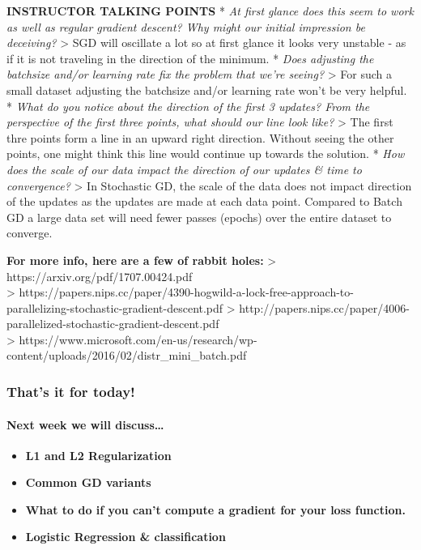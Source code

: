\documentclass[11pt]{article}
\providecommand{\tightlist}{%
      \setlength{\itemsep}{0pt}\setlength{\parskip}{0pt}}
\begin{document}
\textbf{INSTRUCTOR TALKING POINTS} * \emph{At first glance does this
seem to work as well as regular gradient descent? Why might our initial
impression be deceiving?} \textgreater{} SGD will oscillate a lot so at
first glance it looks very unstable - as if it is not traveling in the
direction of the minimum. * \emph{Does adjusting the batchsize and/or
learning rate fix the problem that we're seeing?} \textgreater{} For
such a small dataset adjusting the batchsize and/or learning rate won't
be very helpful. * \emph{What do you notice about the direction of the
first 3 updates? From the perspective of the first three points, what
should our line look like?} \textgreater{} The first thre points form a
line in an upward right direction. Without seeing the other points, one
might think this line would continue up towards the solution. *
\emph{How does the scale of our data impact the direction of our updates
\& time to convergence?} \textgreater{} In Stochastic GD, the scale of
the data does not impact direction of the updates as the updates are
made at each data point. Compared to Batch GD a large data set will need
fewer passes (epochs) over the entire dataset to converge.

    \textbf{For more info, here are a few of rabbit holes:} \textgreater{}
https://arxiv.org/pdf/1707.00424.pdf\\
\textgreater{}
https://papers.nips.cc/paper/4390-hogwild-a-lock-free-approach-to-parallelizing-stochastic-gradient-descent.pdf
\textgreater{}
http://papers.nips.cc/paper/4006-parallelized-stochastic-gradient-descent.pdf\\
\textgreater{}
https://www.microsoft.com/en-us/research/wp-content/uploads/2016/02/distr\_mini\_batch.pdf

    \hypertarget{thats-it-for-today}{%
\subsubsection{That's it for today!}\label{thats-it-for-today}}

\hypertarget{next-week-we-will-discuss}{%
\paragraph{Next week we will
discuss\ldots{}}\label{next-week-we-will-discuss}}

\begin{itemize}
\tightlist
\item
  \textbf{L1 and L2 Regularization}
\item
  \textbf{Common GD variants}
\item
  \textbf{What to do if you can't compute a gradient for your loss
  function.}
\item
  \textbf{Logistic Regression \& classification}
\end{itemize}


    
    
    
    
\end{document}
